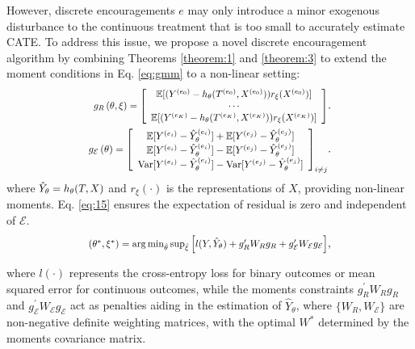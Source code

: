 \documentclass[journal]{IEEEtran}
\newcommand*{\Scale}[2][4]{\scalebox{#1}{$#2$}}
\begin{document}
However, discrete encouragements $e$ may only introduce a minor exogenous disturbance to the continuous treatment that is too small to accurately estimate CATE. To address this issue, we propose a novel discrete encouragement algorithm by combining Theorems \ref{theorem:1} and \ref{theorem:3} to extend the moment conditions in Eq. \eqref{eq:gmm} to a non-linear setting:
\begin{eqnarray}
\label{eq:14}
\Scale[0.85]{
g_R\left(\theta, \xi\right)=\left[\begin{array}{c}
\mathbb{E}[({Y}^{(e_0)} - h_{\theta}( T^{(e_0)}, X^{(e_0)})) r_\xi({X}^{(e_0)})] \\
\cdots \\
\mathbb{E}[({Y}^{(e_K)} - h_{\theta}( T^{(e_K)}, X^{(e_K)}))r_\xi({X}^{(e_K)})]
\end{array}\right]
}. \\
\Scale[0.88]{
g_{\mathcal{E}}\left(\theta\right) = 
\left[\begin{array}{c}
\mathbb{E}[Y^{(e_i)} - \hat{Y}_{\theta}^{(e_i)}]  +
\mathbb{E}[Y^{(e_j)} - \hat{Y}_{\theta}^{(e_j)}]  \\
\mathbb{E}[Y^{(e_i)} - \hat{Y}_{\theta}^{(e_i)}]  -
\mathbb{E}[Y^{(e_j)} - \hat{Y}_{\theta}^{(e_j)}] 
\\
\operatorname{Var}[Y^{(e_i)} - \hat{Y}_{\theta}^{(e_i)}]  -
\operatorname{Var}[Y^{(e_j)} - \hat{Y}_{\theta}^{(e_j)}]
\end{array}\right]_{i \not= j}}.
\label{eq:15}
\end{eqnarray}
where $\Scale[0.92]{\hat{Y}_{\theta} = h_{\theta}( T, X)}$ and $r_\xi(\cdot)$ is the representations of $X$, providing non-linear moments. Eq. \eqref{eq:15} ensures the expectation of residual is zero and independent of $\mathcal{E}$.
\begin{eqnarray} \label{eq:ours}
\Scale[0.87]{
\left({\theta}^\ast, {\xi}^\ast \right)
= 
\arg \min_{\hat{\theta}} \sup_{\hat{\xi}}
\left[l(Y,\hat{Y}_{\theta}) 
+
g_R^\prime W_R g_R
+ 
g_{\mathcal{E}}^\prime W_{\mathcal{E}} g_{\mathcal{E}}
\right]
},
\end{eqnarray}

where $l(\cdot)$ represents the cross-entropy loss for binary outcomes or mean squared error for continuous outcomes, while the moments constraints $g_R^\prime W_R g_R$ and $g_{\mathcal{E}}^\prime W_{\mathcal{E}} g_{\mathcal{E}}$ act as penalties aiding in the estimation of $\hat{Y}_\theta$, where $\{W_R,W_{\mathcal{E}}\}$ are non-negative definite weighting matrices, with the optimal $W^\ast$ determined by the moments covariance matrix.
\end{document}
